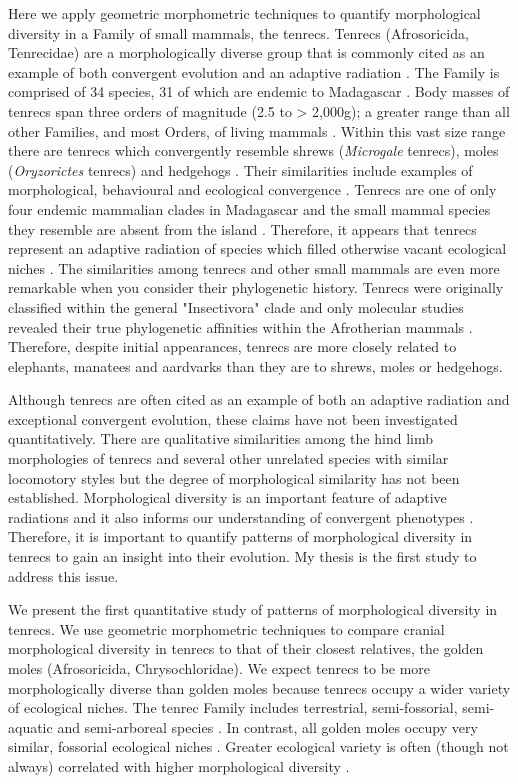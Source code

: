 \documentclass[12pt,a4paper]{article}
\begin{document}
	Here we apply geometric morphometric techniques to quantify morphological diversity in a Family of small mammals, the tenrecs. Tenrecs (Afrosoricida, Tenrecidae) are a morphologically diverse group that is commonly cited as an example of both convergent evolution and an adaptive radiation \citep{Soarimalala2011, Eisenberg1969}. The Family is comprised of 34 species, 31 of which are endemic to Madagascar \citep{Olson2013}. Body masses of tenrecs span three orders of magnitude (2.5 to > 2,000g); a greater range than all other Families, and most Orders, of living mammals \citep{Olson2003}. Within this vast size range there are tenrecs which convergently resemble shrews (\textit{Microgale} tenrecs), moles (\textit{Oryzorictes} tenrecs) and hedgehogs \citep[\textit{Echinops} and \textit{Setifer} tenrecs,][]{Eisenberg1969}. Their similarities include examples of morphological, behavioural and ecological convergence \citep{Soarimalala2011}. Tenrecs are one of only four endemic mammalian clades in Madagascar and the small mammal species they resemble are absent from the island \citep{Garbutt1999}. Therefore, it appears that tenrecs represent an adaptive radiation of species which filled otherwise vacant ecological niches \citep{Soarimalala2011}.
	The similarities among tenrecs and other small mammals are even more remarkable when you consider their phylogenetic history. Tenrecs were originally classified within the general "Insectivora" clade and only molecular studies revealed their true phylogenetic affinities within the Afrotherian mammals \citep{Stanhope1998}. Therefore, despite initial appearances, tenrecs are more closely related to elephants, manatees and aardvarks than they are to shrews, moles or hedgehogs. 

	Although tenrecs are often cited as an example of both an adaptive radiation and exceptional convergent evolution, these claims have not been investigated quantitatively. There are qualitative similarities among the hind limb morphologies of tenrecs and several other unrelated species with similar locomotory styles \citep{Salton2009} but the degree of morphological similarity has not been established. Morphological diversity is an important feature of adaptive radiations \citep{Losos2010a} and it also informs our understanding of convergent phenotypes \citep{Muschick2012}. Therefore, it is important to quantify patterns of morphological diversity in tenrecs to gain an insight into their evolution. My thesis is the first study to address this issue. 
	
	
	We present the first quantitative study of patterns of morphological diversity in tenrecs. We use geometric morphometric techniques \citep{Rohlf1993} to compare cranial morphological diversity in tenrecs to that of their closest relatives, the golden moles (Afrosoricida, Chrysochloridae). 
	We expect tenrecs to be more morphologically diverse than golden moles because tenrecs occupy a wider variety of ecological niches. The tenrec Family includes terrestrial, semi-fossorial, semi-aquatic and semi-arboreal species \citep{Soarimalala2011}. In contrast, all golden moles occupy very similar, fossorial ecological niches \citep{Bronner1995}. Greater ecological variety is often (though not always) correlated with higher morphological diversity \citep{Losos2010a}. 
	
\end{document}
